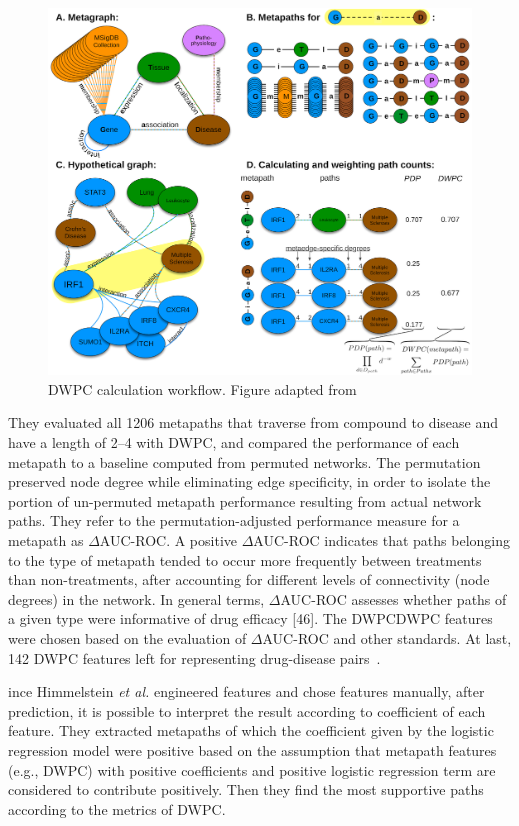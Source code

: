 \begin{figure}[!h]
    \centering
    \includegraphics[scale=0.2]
    {figures/DWPC.png}
    \captionsetup{justification=centering}
    \caption[DWPC calculation workflow]{\label{fig:DWPC} DWPC calculation workflow. Figure adapted from~\cite{himmelstein_systematic_2017}}
\end{figure}

They evaluated all 1206 metapaths that traverse from compound to disease and have a length of 2–4 with \ac{DWPC}, and compared the performance of each metapath to a baseline computed from permuted networks. The permutation preserved node degree while eliminating edge specificity, in order to isolate the portion of un-permuted metapath performance resulting from actual network paths. They refer to the permutation-adjusted performance measure for a metapath as $\Delta$\ac{AUC-ROC}. A positive $\Delta$\ac{AUC-ROC} indicates that paths belonging to the type of metapath tended to occur more frequently between treatments than non-treatments, after accounting for different levels of connectivity (node degrees) in the network. In general terms, $\Delta$\ac{AUC-ROC} assesses whether paths of a given type were informative of drug efficacy [46]. The \ac{DWPC}\ac{DWPC} features were chosen based on the evaluation of $\Delta$\ac{AUC-ROC} and other standards. At last, 142 \ac{DWPC} features left for representing drug-disease pairs~\cite{himmelstein_hetnet_2016}.

ince Himmelstein \textit{et al.} engineered features and chose features manually, after prediction, it is possible to interpret the result according to coefficient of each feature. They extracted metapaths of which the coefficient given by the logistic regression model were positive based on the assumption that metapath features (e.g., \ac{DWPC}) with positive coefficients and positive logistic regression term are considered to contribute positively. Then they find the most supportive paths according to the metrics of \ac{DWPC}.

